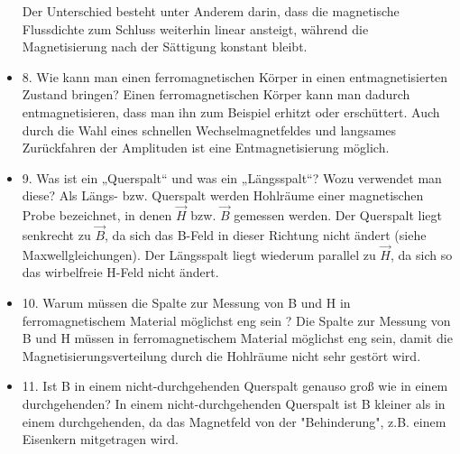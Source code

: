\begin{itemize}
\begin{figure}[!h]
\end{figure}
	Der Unterschied besteht unter Anderem darin, dass die magnetische Flussdichte zum Schluss weiterhin linear ansteigt, während die Magnetisierung nach der Sättigung konstant bleibt.
\item 8. Wie kann man einen ferromagnetischen Körper in einen entmagnetisierten Zustand bringen?
\newline
Einen ferromagnetischen Körper kann man dadurch entmagnetisieren, dass man ihn zum Beispiel erhitzt oder  erschüttert. Auch durch die Wahl eines schnellen Wechselmagnetfeldes und langsames Zurückfahren der Amplituden ist eine Entmagnetisierung möglich.
\item 9. Was ist ein „Querspalt“ und was ein „Längsspalt“? Wozu verwendet man diese?
\newline
Als Längs- bzw. Querspalt werden Hohlräume einer magnetischen Probe bezeichnet, in denen $\vec{H}$ bzw. $\vec{B}$ gemessen werden. Der Querspalt liegt senkrecht zu $\vec{B}$, da sich das B-Feld in dieser Richtung nicht ändert (siehe Maxwellgleichungen). Der Längsspalt liegt wiederum parallel zu $\vec{H}$, da sich so das wirbelfreie H-Feld nicht ändert. \\
\item 10. Warum müssen die Spalte zur Messung von
B und H in ferromagnetischem Material möglichst
eng sein ?
\newline
Die Spalte zur Messung von B und H müssen in ferromagnetischem Material möglichst eng sein, damit die Magnetisierungsverteilung durch die Hohlräume nicht sehr gestört wird.
\item 11. Ist
B in einem nicht-durchgehenden Querspalt genauso groß wie in einem durchgehenden?
\newline
In einem nicht-durchgehenden Querspalt ist B kleiner als in einem durchgehenden, da das Magnetfeld von der "Behinderung", z.B. einem Eisenkern mitgetragen wird.


\end{itemize}
